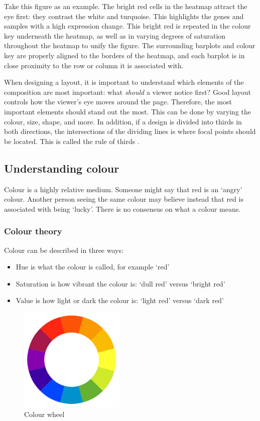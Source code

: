 \documentclass[letterpaper]{article}\usepackage[]{graphicx}\usepackage[]{color}
\begin{document}
Take this figure as an example. The bright red cells in the heatmap attract the eye first: they contrast the white and turquoise. This highlights the genes and samples with a high expression change. This bright red is repeated in the colour key underneath the heatmap, as well as in varying degrees of saturation throughout the heatmap to unify the figure. The surrounding barplots and colour key are properly aligned to the borders of the heatmap, and each barplot is in close proximity to the row or column it is associated with. 

When designing a layout, it is important to understand which elements of the composition are most important: what \textit{should} a viewer notice first? Good layout controls how the viewer's eye moves around the page. Therefore, the most important elements should stand out the most. This can be done by varying the colour, size, shape, and more. In addition, if a design is divided into thirds in both directions, the intersections of the dividing lines is where focal points should be located. This is called the rule of thirds \cite{wong3}.

\subsection{Understanding colour}
Colour is a highly relative medium. Someone might say that red is an `angry' colour. Another person seeing the same colour may believe instead that red is associated with being `lucky'. There is no consensus on what a colour means. 

\subsubsection{Colour theory}
Colour can be described in three ways:
\begin{itemize}
\item Hue is what the colour is called, for example `red'
\item Saturation is how vibrant the colour is: `dull red' versus `bright red'
\item Value is how light or dark the colour is: `light red' versus `dark red'
\end{itemize}

\begin{figure}[!ht]
  \begin{center}
     \includegraphics[width=50mm]{Figures/colour_wheel.png}
     \caption{Colour wheel}
  \end{center}
\end{figure}
\end{document}
